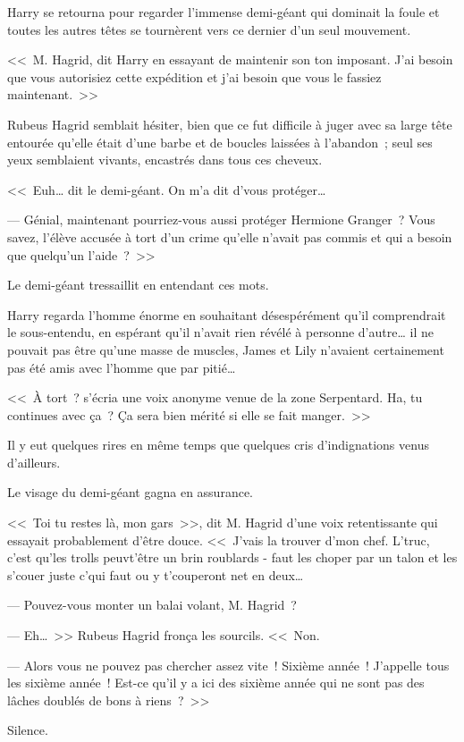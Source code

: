 Harry se retourna pour regarder l'immense demi-géant qui dominait la foule et toutes les autres têtes se tournèrent vers ce dernier d'un seul mouvement.

<<~M. Hagrid, dit Harry en essayant de maintenir son ton imposant. J'ai besoin que vous autorisiez cette expédition et j'ai besoin que vous le fassiez maintenant.~>>

Rubeus Hagrid semblait hésiter, bien que ce fut difficile à juger avec sa large tête entourée qu'elle était d'une barbe et de boucles laissées à l'abandon~; seul ses yeux semblaient vivants, encastrés dans tous ces cheveux.

<<~Euh… dit le demi-géant. On m'a dit d'vous protéger…

--- Génial, maintenant pourriez-vous aussi protéger Hermione Granger~? Vous savez, l'élève accusée à tort d'un crime qu'elle n'avait pas commis et qui a besoin que quelqu'un l'aide~?~>>

Le demi-géant tressaillit en entendant ces mots.

Harry regarda l'homme énorme en souhaitant désespérément qu'il comprendrait le sous-entendu, en espérant qu'il n'avait rien révélé à personne d'autre… il ne pouvait pas être qu'une masse de muscles, James et Lily n'avaient certainement pas été amis avec l'homme que par pitié…

<<~À tort~? s'écria une voix anonyme venue de la zone Serpentard. Ha, tu continues avec ça~? Ça sera bien mérité si elle se fait manger.~>>

Il y eut quelques rires en même temps que quelques cris d'indignations venus d'ailleurs.

Le visage du demi-géant gagna en assurance.

<<~Toi tu restes là, mon gars~>>, dit M. Hagrid d'une voix retentissante qui essayait probablement d'être douce. <<~J'vais la trouver d'mon chef. L'truc, c'est qu'les trolls peuvt'être un brin roublards - faut les choper par un talon et les s'couer juste c'qui faut ou y t'couperont net en deux…

--- Pouvez-vous monter un balai volant, M. Hagrid~?

--- Eh…~>> Rubeus Hagrid fronça les sourcils. <<~Non.

--- Alors vous ne pouvez pas chercher assez vite~! Sixième année~! J'appelle tous les sixième année~! Est-ce qu'il y a ici des sixième année qui ne sont pas des lâches doublés de bons à riens~?~>>

Silence.

